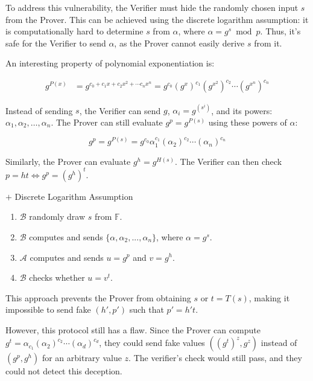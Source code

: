 \documentclass{article}
\begin{document}
To address this vulnerability, the Verifier must hide the randomly chosen input $s$ from the Prover. This can be achieved using the discrete logarithm assumption: it is computationally hard to determine $s$ from $\alpha$, where $\alpha = g^s \bmod p$. Thus, it's safe for the Verifier to send $\alpha$, as the Prover cannot easily derive $s$ from it.

An interesting property of polynomial exponentiation is:

\begin{align}
    g^{P(x)} &= g^{c_0 + c_1 x + c_2 x^{2} + \cdots c_n x^{n}} = g^{c_0} (g^{x})^{c_1}  (g^{x^2})^{c_2} \cdots (g^{x^n})^{c_n}
\end{align}

Instead of sending $s$, the Verifier can send $g$, $\alpha_{i} = g^{(s^i)}$, and its powers: $\alpha_1, \alpha_2, \ldots, \alpha_n$. The Prover can still evaluate $g^p = g^{P(s)}$ using these powers of $\alpha$:

\begin{equation}
    g^{p} = g^{P(s)} = g^{c_0} \alpha_{1}^{c_1} (\alpha_{2})^{c_2} \cdots (\alpha_{n})^{c_n}
\end{equation}

Similarly, the Prover can evaluate $g^h = g^{H(s)}$. The Verifier can then check $p = ht \iff g^p = (g^h)^t$.

\begin{protocol}{$+$ Discrete Logarithm Assumption}{}
\begin{enumerate}
    \item $\mathcal{B}$ randomly draw $s$ from $\mathbb{F}$.
    \item $\mathcal{B}$ computes and sends $\{\alpha, \alpha_2, ..., \alpha_{n}\}$, where $\alpha = g^{s}$.
    \item $\mathcal{A}$ computes and sends $u = g^{p}$ and $v = g^{h}$.
    \item $\mathcal{B}$ checks whether $u = v^{t}$.
\end{enumerate}
\end{protocol}

This approach prevents the Prover from obtaining $s$ or $t = T(s)$, making it impossible to send fake $(h', p')$ such that $p' = h't$.

However, this protocol still has a flaw. Since the Prover can compute $g^t = \alpha_{c_1}(\alpha_2)^{c_2}\cdots(\alpha_d)^{c_d}$, they could send fake values $((g^{t})^{z}, g^{z})$ instead of $(g^p, g^h)$ for an arbitrary value $z$. The verifier's check would still pass, and they could not detect this deception.
\end{document}
